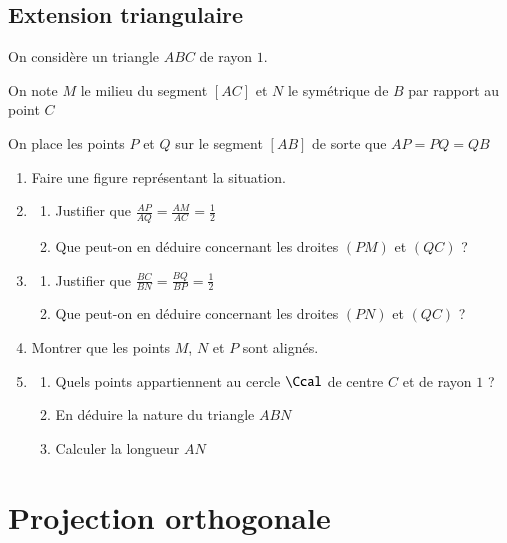 \documentclass[oneside,12pt]{article}          %
\begin{document}
\subsection{Extension triangulaire}
On considère un triangle $ABC$ de rayon $1$. 

On note $M$ le milieu du segment $[AC]$ et $N$ le symétrique de $B$ par rapport au point $C$ 

On place les points $P$ et $Q$ sur le segment $[AB]$ de sorte que $AP=PQ=QB$
\begin{enumerate}
	\item Faire une figure représentant la situation.
	\item \begin{enumerate}
		\item Justifier que $\frac{AP}{AQ}=\frac{AM}{AC}=\frac{1}{2}$
		\item Que peut-on en déduire concernant les droites $(PM)$ et $(QC)$ ?
	\end{enumerate}
	\item \begin{enumerate}
		\item Justifier que $\frac{BC}{BN}=\frac{BQ}{BP}=\frac{1}{2}$
		\item Que peut-on en déduire concernant les droites $(PN)$ et $(QC)$ ?
	\end{enumerate}
	\item Montrer que les points $M$, $N$ et $P$ sont alignés.
	\item \begin{enumerate}
		\item Quels points appartiennent au cercle $\Ccal$ de centre $C$ et de rayon $1$ ?
		\item En déduire la nature du triangle $ABN$
		\item Calculer la longueur $AN$
	\end{enumerate}
\end{enumerate}




\section{Projection orthogonale}
\end{document}
